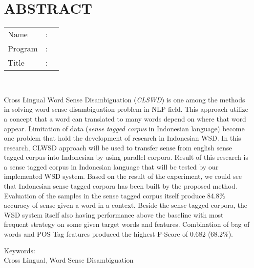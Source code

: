 %
%
%

\chapter*{ABSTRACT}

\vspace*{0.2cm}

\noindent \begin{tabular}{l l p{11.0cm}}
	Name&: & \penulis \\
	Program&: & \programEng \\
	Title&: & \judulInggris \\
\end{tabular} \\ 

\vspace*{0.5cm}

\noindent 
Cross Lingual Word Sense Disambiguation (\textit{CLSWD}) is one among the methods in solving word sense disambiguation problem in NLP field. This approach utilize a concept that a word can translated to many words depend on where that word appear. Limitation of data (\textit{sense tagged corpus} in Indonesian language) become one problem that hold the development of research in Indonesian WSD. In this research, CLWSD approach will be used to transfer sense from english sense tagged corpus into Indonesian by using parallel corpora. Result of this research is a sense tagged corpus in Indonesian language that will be tested by our implemented WSD system. Based on the result of the experiment, we could see that Indonesian sense tagged corpora has been built by the proposed method. Evaluation of the samples in the sense tagged corpus itself produce 84.8\% accuracy of sense given a word in a context. Beside the sense tagged corpora, the WSD system itself also having performance above the baseline with most frequent strategy on some given target words and features. Combination of bag of words and POS Tag features produced the highest F-Score of 0.682 (68.2\%).
\vspace*{0.2cm}

\noindent Keywords: \\ 
\noindent Cross Lingual, Word Sense Disambiguation

\newpage